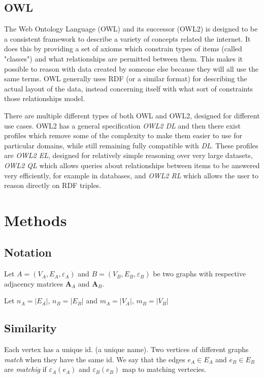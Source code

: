 \documentclass[english, 12pt]{article}
\begin{document}
\subsection{OWL}
The Web Ontology Language (OWL) and its successor (OWL2) is designed to be a consistent framework to describe a variety of concepts related the internet. It does this by providing a set of axioms which constrain types of items (called "classes") and what relationships are permitted between them. This makes it possible to reason with data created by someone else because they will all use the same terms. OWL generally uses RDF (or a similar format) for describing the actual layout of the data, instead concerning itself with what sort of constraints those relationships model.

There are multiple different types of both OWL and OWL2, designed for different use cases. OWL2 has a general specification \emph{OWL2 DL}\cite{w3c_owl2} and then there exist profiles which remove some of the complexity to make them easier to use for particular domains, while still remaining fully compatible with \emph{DL}. These profiles are \emph{OWL2 EL}, designed for relatively simple reasoning over very large datasets, \emph{OWL2 QL} which allows queries about relationships between items to be answered very efficiently, for example in databases, and \emph{OWL2 RL} which allows the user to reason directly on RDF triples.

\section{Methods}

\subsection*{Notation}

Let $A = (V_A,E_A, \varepsilon_A)$ and $B = (V_B,E_B, \varepsilon_B)$ be two graphs with respective adjacency matrices $\mathbf A_A$ and $\mathbf A_B$.

Let $n_A = |E_A|$, $n_B = |E_B|$ and $m_A = |V_A|$, $m_B = |V_B|$

\subsection{Similarity}
Each vertex has a unique id. (a unique name). Two vertices of different graphs {\it match} when they have the same id.
We say that the edges $e_A \in E_A$ and $e_B \in E_B$ are {\it matchig} if $\varepsilon_A(e_A)$ and $\varepsilon_B(e_B)$ map to matching vertecies.
\end{document}
